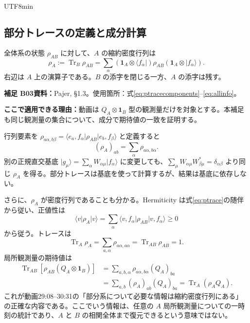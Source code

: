 \documentclass[11pt,a4paper]{article}
\numberwithin{equation}{section}
\newcommand{\Tr}{\operatorname{Tr}}
\newcommand{\I}{\mathbf{1}}
\newcommand{\ket}[1]{\lvert#1\rangle}
\newcommand{\bra}[1]{\langle#1\rvert}
\newcommand{\supp}[3]{\par\smallskip\noindent\textcolor{BrickRed}{\textbf{補足 #1}}\quad\textbf{資料：}#2\par\noindent\textbf{ここで適用できる理由：}#3\par}
\begin{document}
\begin{CJK*}{UTF8}{min}
\subsection{部分トレースの定義と成分計算}
全体系の状態 $\rho_{AB}$ に対して、$A$ の縮約密度行列は
\begin{equation}
\rho_A:=\Tr_B\rho_{AB}
=\sum_\alpha(\I_A\otimes\bra{f_\alpha})
\rho_{AB}(\I_A\otimes\ket{f_\alpha}).
\label{eq:ptrace}
\end{equation}
右辺は $A$ 上の演算子である。$B$ の添字を閉じる一方、$A$ の添字は残す。

\supp{B03}{Pajer\cite{pajer}, §1.3。使用箇所：式\eqref{eq:ptracecomponents}--\eqref{eq:allinfo}。}{動画は $Q_A\otimes\I_B$ 型の観測量だけを対象とする。本補足も同じ観測量の集合について、成分で期待値の一致を証明する。}
行列要素を $\rho_{a\alpha,b\beta}=\bra{e_a,f_\alpha}\rho_{AB}\ket{e_b,f_\beta}$ と定義すると
\begin{equation}
(\rho_A)_{ab}=\sum_\alpha \rho_{a\alpha,b\alpha}.
\label{eq:ptracecomponents}
\end{equation}
別の正規直交基底 $\ket{g_\mu}=\sum_\alpha W_{\alpha\mu}\ket{f_\alpha}$ に変更しても、$\sum_\mu W_{\alpha\mu}W^*_{\beta\mu}=\delta_{\alpha\beta}$ より同じ $\rho_A$ を得る。部分トレースは基底を使って計算するが、結果は基底に依存しない。

さらに、$\rho_A$ が密度行列であることも分かる。Hermiticity は式\eqref{eq:ptrace}の随伴から従い、正値性は
\begin{equation}
\bra{v}\rho_A\ket{v}
=\sum_\alpha\bra{v,f_\alpha}\rho_{AB}\ket{v,f_\alpha}\geq0
\end{equation}
から従う。トレースは
\begin{equation}
\Tr_A\rho_A=\sum_{a,\alpha}\rho_{a\alpha,a\alpha}
=\Tr_{AB}\rho_{AB}=1.
\end{equation}
局所観測量の期待値は
\begin{align}
\Tr_{AB}[\rho_{AB}(Q_A\otimes\I_B)]
&=\sum_{a,b,\alpha}\rho_{a\alpha,b\alpha}(Q_A)_{ba}\nonumber\\
&=\sum_{a,b}(\rho_A)_{ab}(Q_A)_{ba}
=\Tr_A(\rho_AQ_A).
\label{eq:allinfo}
\end{align}
これが動画29:08--30:31の「部分系について必要な情報は縮約密度行列にある」の正確な内容である。ここでいう情報は、任意の $A$ 局所観測量についての一時刻の統計であり、$A$ と $B$ の相関全体まで復元できるという意味ではない。


\end{CJK*}
\end{document}
